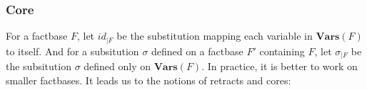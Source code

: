 \documentclass{article}
\theoremstyle{definition}
\theoremstyle{remark}
\newcommand{\Vars}{\textbf{Vars}}
\newcommand{\Terms}{\textbf{Terms}}
\begin{document}




\subsubsection{Core}

For a factbase $F$, let $id_{|F}$ be the substitution mapping each variable in $\Vars(F)$ to itself. And for a subsitution $\sigma$ defined on a factbase $F'$ containing $F$, let $\sigma_{|F}$ be the subsitution $\sigma$ defined only on $\Vars(F)$. In practice, it is better to work on smaller factbases. It leads us to the notions of retracts and cores:
\end{document}

